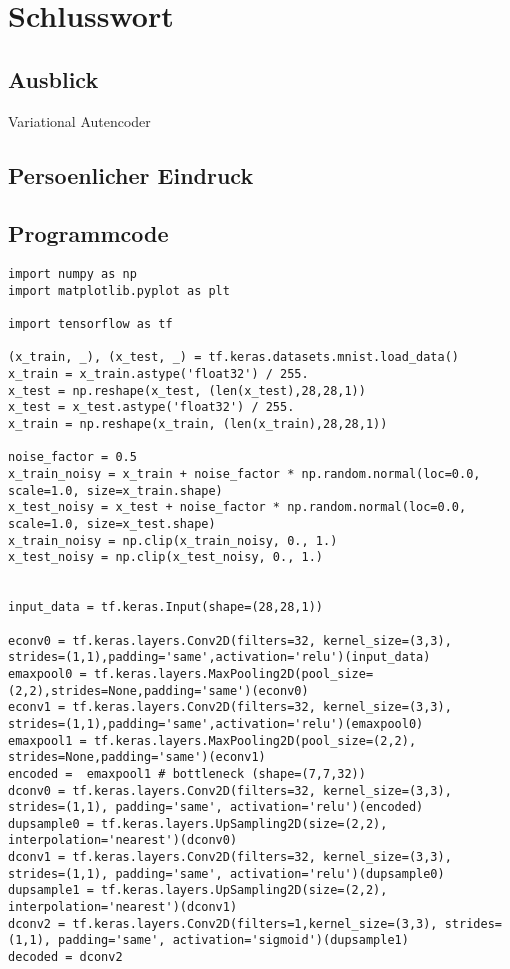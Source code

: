 \chapter*{Schlusswort}
\section*{Ausblick}
Variational Autencoder

\section*{Persoenlicher Eindruck}

\begin{appendices}
\chapter{Programmcode}

\begin{verbatim}
import numpy as np
import matplotlib.pyplot as plt

import tensorflow as tf

(x_train, _), (x_test, _) = tf.keras.datasets.mnist.load_data()
x_train = x_train.astype('float32') / 255.
x_test = np.reshape(x_test, (len(x_test),28,28,1))
x_test = x_test.astype('float32') / 255.
x_train = np.reshape(x_train, (len(x_train),28,28,1))

noise_factor = 0.5
x_train_noisy = x_train + noise_factor * np.random.normal(loc=0.0, scale=1.0, size=x_train.shape)
x_test_noisy = x_test + noise_factor * np.random.normal(loc=0.0, scale=1.0, size=x_test.shape)
x_train_noisy = np.clip(x_train_noisy, 0., 1.)
x_test_noisy = np.clip(x_test_noisy, 0., 1.)


input_data = tf.keras.Input(shape=(28,28,1))

econv0 = tf.keras.layers.Conv2D(filters=32, kernel_size=(3,3), strides=(1,1),padding='same',activation='relu')(input_data)
emaxpool0 = tf.keras.layers.MaxPooling2D(pool_size=(2,2),strides=None,padding='same')(econv0)
econv1 = tf.keras.layers.Conv2D(filters=32, kernel_size=(3,3), strides=(1,1),padding='same',activation='relu')(emaxpool0)
emaxpool1 = tf.keras.layers.MaxPooling2D(pool_size=(2,2), strides=None,padding='same')(econv1)
encoded =  emaxpool1 # bottleneck (shape=(7,7,32))
dconv0 = tf.keras.layers.Conv2D(filters=32, kernel_size=(3,3), strides=(1,1), padding='same', activation='relu')(encoded)
dupsample0 = tf.keras.layers.UpSampling2D(size=(2,2), interpolation='nearest')(dconv0)
dconv1 = tf.keras.layers.Conv2D(filters=32, kernel_size=(3,3), strides=(1,1), padding='same', activation='relu')(dupsample0)
dupsample1 = tf.keras.layers.UpSampling2D(size=(2,2), interpolation='nearest')(dconv1)
dconv2 = tf.keras.layers.Conv2D(filters=1,kernel_size=(3,3), strides=(1,1), padding='same', activation='sigmoid')(dupsample1)
decoded = dconv2


\end{verbatim}
\end{appendices}
